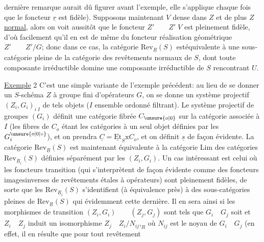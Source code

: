 dernière remarque aurait dû figurer avant l'exemple, elle s'applique chaque fois que le foncteur $\underline{r}$ est fidèle).  Supposons maintenant $V$ dense dans $Z$ et de plus $Z$ \uline{normal}, alors on voit aussitôt que le foncteur $Z'\qquad Z'\;V$ est pleinement fidèle, d'où  facilement qu'il en est de même du foncteur réalisation géométrique $Z'\qquad Z'/G$; donc dans ce cas, la catégorie $\mathrm{Rev}_{\underline{R}}(S)$  estéquivalente à une sous-catégorie pleine de la catégorie des revêtements  normaux de $S$, dont toute composante  irréductible domine une composante irréductible de $S$ rencontrant $U$.

\uline{Exemple} 2 C'est une simple variante de l'exemple précédent: au lieu de se donner un $S$-schéma $Z$ à groupe fini d'opérateurs $G$, on se donne un système projectif $(Z_i,G_i)_{i\;I}$ de tels objets ($I$ ensemble ordonné filtrant).  Le système projectif de groupes $(G_i)$ définit une catégorie fibrée $C_{\unsure{o|0}}$ sur la catégorie associée à $I$ (les fibres de $C_o$ étant les catégories à un seul objet définies par les $G_i^{\unsure{o|0|\circ}}$), et on prendra $\underline{C}=\underline{\mathrm{Et}}_S\mathrm{x}C_o$, et on définit $\underline{s}$ de façon évidente. La catégorie $\mathrm{Rev}_{\underline{R}}(S)$ est maintenant équivalente à la catégorie $\mathrm{Lim}$ des catégories $\mathrm{Rev}_{\underline{R}_i}(S)$ définies séparément par les $(Z_i,G_i)$. Un cas intéressant est celui où les foncteurs transition (qui s'interprètent de façon évidente comme des foncteurs imagesinverses de revêtements étales à opérateurs) sont pleinement fidèles, de sorte que les $\mathrm{Rev}_{\underline{R}_i}(S)$ s'identifient (à équivalence près) à des sous-catégories pleines de $\mathrm{Rev}_{\underline{R}}(S)$ qui  évidemment cette dernière. Il en sera ainsi si les morphismes de transition $(Z_i,G_i)\qquad(Z_j,G_j)$ sont tels que $G_i\quad G_j$ soit  et $Z_i\quad Z_j$ induit un isomorphisme $Z_j\quad Z_i/N_{ij}\mathord{,}_{R}$ où $N_{ij}$ est le noyau de $G_i\quad G_j$ (en effet, il en résulte que pour tout revêtement 
